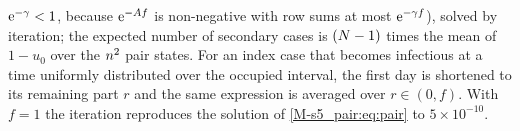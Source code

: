 \begin{remark}
  $\mathrm{e}^{-\gamma}<1$, because $\mathrm{e}^{-Af}$ is non-negative with row sums at most $\mathrm{e}^{-\gamma f}$), solved by
  iteration; the expected number of secondary cases is $(N-1)$ times the mean of $1-u_0$ over the
  $n^2$ pair states. For an index case that becomes infectious at a time uniformly distributed over the
  occupied interval, the first day is shortened to its remaining part $r$ and the same expression is averaged
  over $r\in(0,f)$. With $f=1$ the iteration reproduces the solution of \eqref{M-s5_pair:eq:pair} to
  $5\times10^{-10}$.
\end{remark}

